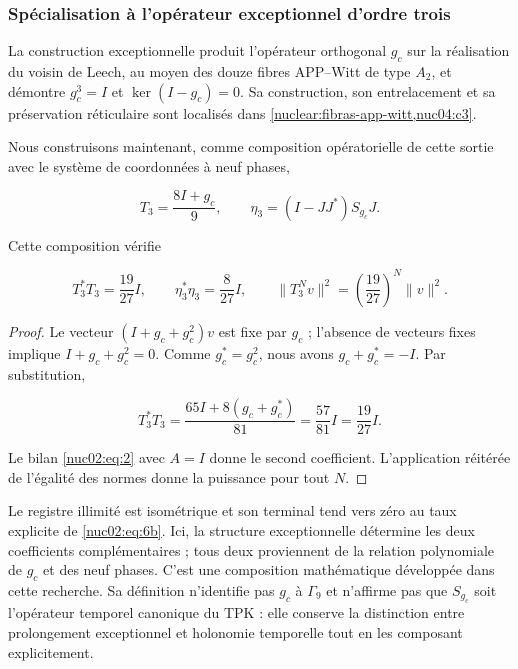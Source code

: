 \subsubsection{Spécialisation à l’opérateur exceptionnel d’ordre trois}

La construction exceptionnelle produit l’opérateur orthogonal \(g_c\) sur la réalisation du voisin de Leech, au moyen des douze fibres APP–Witt de type \(A_2\), et démontre \(g_c^3=I\) et \(\ker(I-g_c)=0\). Sa construction, son entrelacement et sa préservation réticulaire sont localisés dans \cref{nuclear:fibras-app-witt,nuc04:c3}.

Nous construisons maintenant, comme composition opératorielle de cette sortie avec le système de coordonnées à neuf phases,

\[
T_3=\frac{8I+g_c}{9},\qquad
\eta_3=(I-JJ^*)S_{g_c}J.
\]

\begin{corollary}
Cette composition vérifie

\begin{equation}
\boxed{T_3^*T_3=\frac{19}{27}I,\qquad
\eta_3^*\eta_3=\frac8{27}I,\qquad
\|T_3^Nv\|^2=\left(\frac{19}{27}\right)^N\|v\|^2.}\label{nuc02:eq:6b}
\end{equation}
\end{corollary}

\begin{proof}
Le vecteur \((I+g_c+g_c^2)v\) est fixe par \(g_c\) ; l’absence de vecteurs fixes implique \(I+g_c+g_c^2=0\). Comme \(g_c^*=g_c^2\), nous avons \(g_c+g_c^*=-I\). Par substitution,

\[
T_3^*T_3=\frac{65I+8(g_c+g_c^*)}{81}
=\frac{57}{81}I=\frac{19}{27}I.
\]

Le bilan \eqref{nuc02:eq:2} avec \(A=I\) donne le second coefficient. L’application réitérée de l’égalité des normes donne la puissance pour tout \(N\).
\end{proof}

Le registre illimité est isométrique et son terminal tend vers zéro au taux explicite de \eqref{nuc02:eq:6b}. Ici, la structure exceptionnelle détermine les deux coefficients complémentaires ; tous deux proviennent de la relation polynomiale de \(g_c\) et des neuf phases. C’est une composition mathématique développée dans cette recherche. Sa définition n’identifie pas \(g_c\) à \(\Gamma_9\) et n’affirme pas que \(S_{g_c}\) soit l’opérateur temporel canonique du TPK : elle conserve la distinction entre prolongement exceptionnel et holonomie temporelle tout en les composant explicitement.

